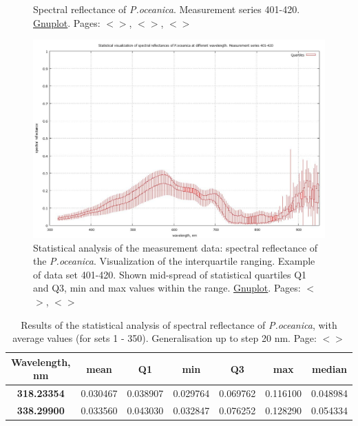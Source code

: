 \documentclass[11pt]{article}
\begin{document}
\begin{appendices}
\begin{figure}[H]
\begin{center}
		\caption{Spectral reflectance of \textit{P.oceanica}. Measurement series 401-420. \href{http://www.gnuplot.info/}{Gnuplot}. Pages:  $<$\pageref{page-21}$>$, $<$\pageref{dataprep}$>$, $<$\pageref{page-31}$>$}
		\label{fig:A.12}
	\end{center}
\end{figure}
\begin{figure}[H]
	\begin{center}
		\includegraphics[scale=0.25]{GNU-401-420-candles.jpg}
		\caption{Statistical analysis of the measurement data: spectral reflectance of the \textit{P.oceanica}. 
		Visualization of the interquartile ranging. Example of data set 401-420. Shown mid-spread of  statistical quartiles Q1 and Q3, min and max values within the range. \href{http://www.gnuplot.info/}{Gnuplot}. Pages: $<$\pageref{page-21}$>$, $<$\pageref{page-31}$>$}
		\label{fig:A.13}
	\end{center}
\end{figure}
\begin{table}[htbp]
	\caption{Results of the statistical analysis of spectral reflectance of \textit{P.oceanica}, with average values (for sets 1 - 350). Generalisation up to step 20 nm. Page: $<$\pageref{page-40}$>$}\label{tab:4.1}
	\begin{center}
	\begin{tabular}{|c|c|c|c|c|c|c|}
	\hline
	Wavelength, nm & mean & Q1 & min & Q3 & max & median \\ \hline
		\textbf{318.23354} & 0.030467 & 0.038907 & 0.029764 & 0.069762 & 0.116100 & 0.048984 \\ \hline
		\textbf{338.29900} & 0.033560 & 0.043030 & 0.032847 & 0.076252 & 0.128290 & 0.054334 \\ \hline

\end{tabular}
\end{center}
\end{table}
\end{appendices}
\end{document}
